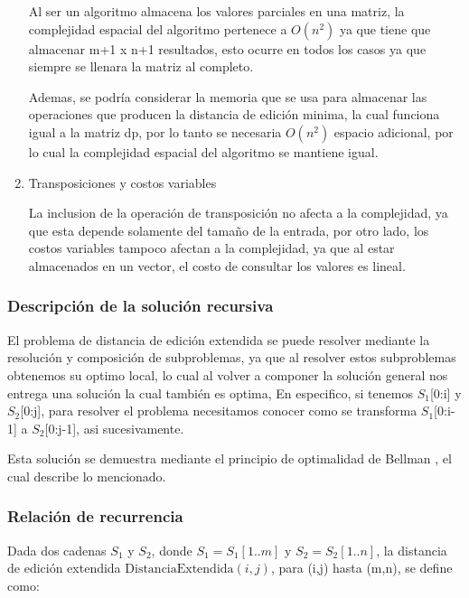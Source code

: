 \begin{enumerate}[1)]
    Al ser un algoritmo almacena los valores parciales en una matriz, 
    la complejidad espacial del algoritmo pertenece a $O\left(n^{2}\right)$ 
    ya que tiene que almacenar m+1 x n+1 resultados, esto ocurre en todos los casos
    ya que siempre se llenara la matriz al completo.
    
    Ademas, se podría considerar la memoria que se usa para almacenar las operaciones
    que producen la distancia de edición minima, la cual funciona igual a la matriz dp,
    por lo tanto se necesaria $O\left(n^{2}\right)$ espacio adicional, por lo cual
    la complejidad espacial del algoritmo se mantiene igual.


    \item Transposiciones y costos variables
    
    La inclusion de la operación de transposición no afecta
    a la complejidad, ya que esta depende solamente del tamaño de la entrada,
    por otro lado, los costos variables tampoco afectan a la complejidad, ya que
    al estar almacenados en un vector, el costo de consultar los valores es lineal.

\end{enumerate}

\subsubsection{Descripción de la solución recursiva}

El problema de distancia de edición extendida se puede resolver
mediante la resolución y composición
de subproblemas, ya que al resolver estos subproblemas obtenemos
su optimo local, lo cual al volver a componer la solución general
nos entrega una solución la cual también es optima, En especifico,
si tenemos $S_1$[0:i] y $S_2$[0:j], para resolver el problema
necesitamos conocer como se transforma $S_1$[0:i-1] a $S_2$[0:j-1], asi sucesivamente.

Esta solución se demuestra mediante el principio de optimalidad de Bellman \cite{optimizaciondp}, el
cual describe lo mencionado.

\subsubsection{Relación de recurrencia}

Dada dos cadenas \( S_1 \) y \( S_2 \), 
donde \( S_1 = S_1[1..m] \) y \( S_2 = S_2[1..n] \),
la distancia de edición extendida 
\( \text{DistanciaExtendida}(i, j) \), para (i,j) hasta (m,n), se define  como:


